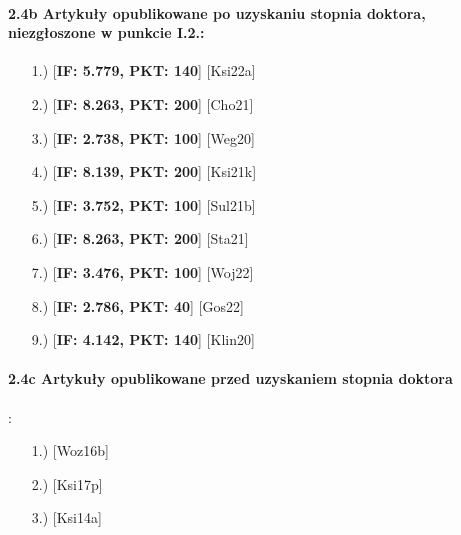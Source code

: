 \begin{fullwidth}
\paragraph{2.4b Artykuły opublikowane po uzyskaniu stopnia doktora, niezgłoszone w punkcie I.2.:}

\begin{itemize}
	\item[1.)] [\textbf{IF: 5.779, PKT: 140}] [Ksi22a] \\\vspace{1em}
	\item[2.)] [\textbf{IF: 8.263, PKT: 200}] [Cho21] \\\vspace{1em}
	\item[3.)] [\textbf{IF: 2.738, PKT: 100}] [Weg20] \\\vspace{1em}
	\item[4.)] [\textbf{IF: 8.139, PKT: 200}] [Ksi21k] \\\vspace{1em}
	\item[5.)] [\textbf{IF: 3.752, PKT: 100}] [Sul21b] \\\vspace{1em}
	\item[6.)] [\textbf{IF: 8.263, PKT: 200}] [Sta21] \\\vspace{1em}
	\item[7.)] [\textbf{IF: 3.476, PKT: 100}] [Woj22] \\\vspace{1em}
	\item[8.)] [\textbf{IF: 2.786, PKT: 40}] [Gos22] \\\vspace{1em}
	\item[9.)] [\textbf{IF: 4.142, PKT: 140}] [Klin20] \\\vspace{1em}
\end{itemize}

\paragraph{2.4c Artykuły opublikowane przed uzyskaniem stopnia doktora}:
\begin{itemize}
	\item[1.)] [Woz16b] \\\vspace{1em}
	\item[2.)] [Ksi17p] \\\vspace{1em}
	\item[3.)] [Ksi14a] \\\vspace{1em}
\end{itemize}



\end{fullwidth}
